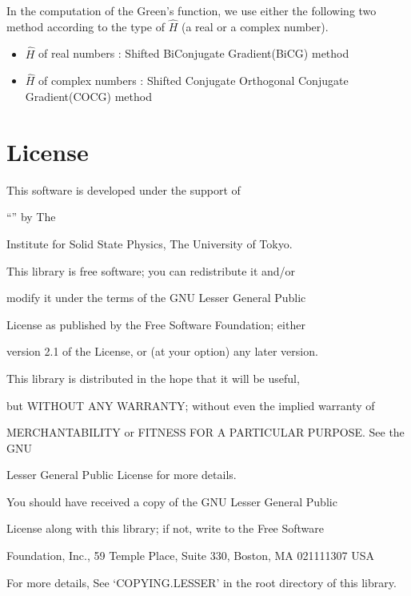 \documentclass[letterpaper,10pt,dvipdfmx,openany,english]{sphinxmanual}
\begin{document}
In the computation of the Green’s function,
we use either the following two method according to the type
of \({\hat H}\) (a real\sphinxhyphen{} or a complex\sphinxhyphen{} number).
\begin{itemize}
\item {} 
\({\hat H}\) of real numbers : Shifted Bi\sphinxhyphen{}Conjugate Gradient(BiCG) method

\item {} 
\({\hat H}\) of complex numbers : Shifted Conjugate Orthogonal Conjugate Gradient(COCG) method

\end{itemize}


\chapter{License}
\label{\detokenize{shiftk_copy_en:license}}\label{\detokenize{shiftk_copy_en::doc}}

\begin{DUlineblock}{0em}
\item[] This software is developed under the support of
\item[] “” by The
\item[] Institute for Solid State Physics, The University of Tokyo.
\item[] 
\item[] This library is free software; you can redistribute it and/or
\item[] modify it under the terms of the GNU Lesser General Public
\item[] License as published by the Free Software Foundation; either
\item[] version 2.1 of the License, or (at your option) any later version.
\item[] This library is distributed in the hope that it will be useful,
\item[] but WITHOUT ANY WARRANTY; without even the implied warranty of
\item[] MERCHANTABILITY or FITNESS FOR A PARTICULAR PURPOSE. See the GNU
\item[] Lesser General Public License for more details.
\item[] 
\item[] You should have received a copy of the GNU Lesser General Public
\item[] License along with this library; if not, write to the Free Software
\item[] Foundation, Inc., 59 Temple Place, Suite 330, Boston, MA 02111\sphinxhyphen{}1307 USA
\item[] 
\item[] For more details, See ‘COPYING.LESSER’ in the root directory of this library.
\end{DUlineblock}
\end{document}
